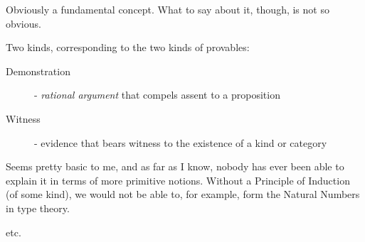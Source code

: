 \begin{description}
\item [Type] Obviously a fundamental concept.  What to say about it, though, is
  not so obvious.
\item [Proposition]
\item [Judgment]
\item [Proof] Two kinds, corresponding to the two kinds of
  provables:
\begin{description}
\item [Demonstration] - \textit{rational argument} that compels assent
  to a proposition
\item [Witness] - evidence that bears witness to the existence of a kind or category
\end{description}
\item [Inference]
\item [Induction] Seems pretty basic to me, and as far as I know,
  nobody has ever been able to explain it in terms of more primitive
  notions.  Without a Principle of Induction (of some kind), we would
  not be able to, for example, form the Natural Numbers in type theory.
\item etc.
\end{description}

